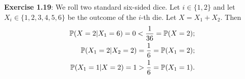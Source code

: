 \textbf{Exercise 1.19}: We roll two standard six-sided dice. Let $i \in \{ 1, 2 \}$
and let $X_i \in \{ 1, 2, 3, 4, 5, 6 \}$ be the outcome of the $i$-th die. Let
$X = X_1 + X_2$. Then
\begin{align*}
  \mathbb{P}(X = 2 | X_1 = 6) = 0 < \frac{1}{36} = \mathbb{P}(X = 2); \\
  \mathbb{P}(X_1 = 2 | X_2 = 2) = \frac{1}{6} = \mathbb{P}(X_1 = 2); \\
  \mathbb{P}(X_1 = 1 | X = 2) = 1 > \frac{1}{6} = \mathbb{P}(X_1 = 1).
\end{align*}
